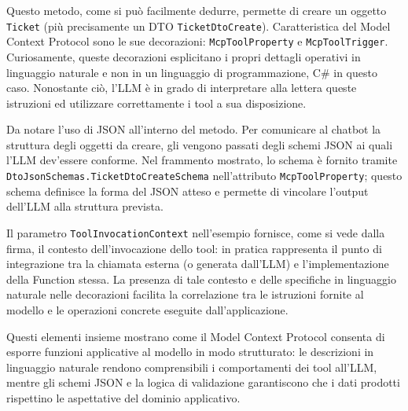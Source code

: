 Questo metodo, come si può facilmente dedurre, permette di creare un oggetto \texttt{Ticket} (più precisamente un DTO \texttt{TicketDtoCreate}).
Caratteristica del Model Context Protocol sono le sue decorazioni: \texttt{McpToolProperty} e \texttt{McpToolTrigger}. Curiosamente, queste
decorazioni esplicitano i propri dettagli operativi in linguaggio naturale e non in un linguaggio di programmazione, C\# in questo caso.
Nonostante ciò, l'LLM è in grado di interpretare alla lettera queste istruzioni ed utilizzare correttamente i tool a sua disposizione.

Da notare l'uso di JSON all'interno del metodo. Per comunicare al chatbot la struttura degli oggetti da creare, gli vengono passati
degli schemi JSON ai quali l'LLM dev'essere conforme. Nel frammento mostrato, lo schema è fornito tramite \texttt{DtoJsonSchemas.TicketDtoCreateSchema}
nell'attributo \texttt{McpToolProperty}; questo schema definisce la forma del JSON atteso e permette di vincolare l'output dell'LLM alla struttura prevista.

Il parametro \texttt{ToolInvocationContext} nell'esempio fornisce, come si vede dalla firma, il contesto dell'invocazione dello tool:
in pratica rappresenta il punto di integrazione tra la chiamata esterna (o generata dall'LLM) e l'implementazione della Function stessa.
La presenza di tale contesto e delle specifiche in linguaggio naturale nelle decorazioni facilita la correlazione tra le istruzioni fornite al modello
e le operazioni concrete eseguite dall'applicazione.

Questi elementi insieme mostrano come il Model Context Protocol consenta di esporre funzioni applicative al modello in modo strutturato:
le descrizioni in linguaggio naturale rendono comprensibili i comportamenti dei tool all'LLM, mentre gli schemi JSON e la logica di validazione
garantiscono che i dati prodotti rispettino le aspettative del dominio applicativo.